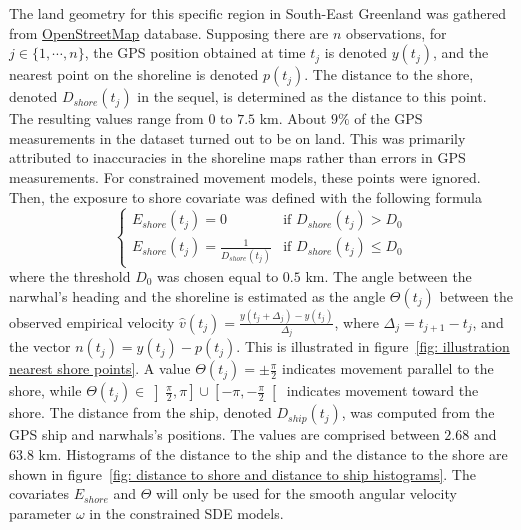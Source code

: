 \documentclass[11pt]{article}
\newcommand {\1}{\mathbb{1}}
\begin{document}
The land geometry for this specific region in South-East Greenland was gathered from \href{https://www.openstreetmap.org/#map=11/70.4029/-27.2928}{OpenStreetMap} database.
Supposing there are $n$ observations, for $j \in \{1,\cdots,n\}$, the GPS position obtained at time $t_j$ is denoted $y(t_j)$, and the nearest point on the shoreline is denoted $p(t_j)$. The distance to the shore, denoted $D_{shore}(t_j)$ in the sequel, is determined as the distance to this point. The resulting values range from $0$ to $7.5$ km. About $9\%$ of the GPS measurements in the dataset turned out to be on land. This was primarily attributed to inaccuracies in the shoreline maps rather than errors in GPS measurements. For constrained movement models, these points were ignored. Then, the exposure to shore covariate was defined with the following formula
\begin{equation}
\left\{
\begin{array}{ll}
	 E_{shore}(t_j)=0 & \mbox{if } D_{shore}(t_j)>D_0 \\
	E_{shore}(t_j)=\frac{1}{D_{shore}(t_j)} & \mbox{if } D_{shore}(t_j) \leq D_0
\end{array}
\right.
\label{eq: exp shore definition}
\end{equation}
where the threshold $D_0$ was chosen equal to $0.5$ km.
The angle between the narwhal's heading and the shoreline is estimated as the angle $\Theta(t_j)$ between the observed empirical velocity $\hat{v}(t_j)=\frac{y(t_j+\Delta_j)-y(t_j)}{\Delta_j}$, where $\Delta_j=t_{j+1}-t_j$, and the vector $n(t_j)=y(t_j)-p(t_j)$. This is illustrated in figure~\ref{fig: illustration nearest shore points}. A value $\Theta(t_j)=\pm \frac{\pi}{2}$ indicates movement parallel to the shore, while $\Theta(t_j) \in \left]\frac{\pi}{2},\pi\right] \cup \left[-\pi,-\frac{\pi}{2}\right[$ indicates movement toward the shore. 
The distance from the ship, denoted $D_{ship}(t_j)$, was computed from the GPS ship and narwhals's positions. The values are comprised between $2.68$ and $63.8$ km.
Histograms of the distance to the ship and the distance to the shore are shown in figure~\ref{fig: distance to shore and distance to ship histograms}. The covariates $E_{shore}$ and $\Theta$ will only be used for the smooth angular velocity parameter $\omega$ in the constrained SDE models.
\end{document}
